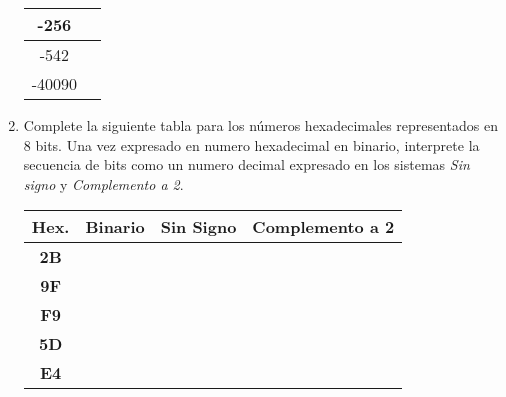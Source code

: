 \documentclass[12pt]{article}
\begin{document}
\begin{enumerate}
\begin{center}
\begin{tabular}[t]{|c|c|}
            \hline

                -256&\\

            \hline

                -542&\\

            \hline

                -40090&\\

            \hline

            \end{tabular}

        \end{center}

    \item Complete la siguiente tabla para los números hexadecimales
        representados en 8 bits. Una vez expresado en numero hexadecimal en
        binario, interprete la secuencia de bits como un numero decimal
        expresado en los sistemas \emph{Sin signo} y \emph{Complemento a 2}.

        \begin{center}

            \begin{tabular}[t]{|c|c|c|c|}

            \hline

                \textbf{Hex.} & \textbf{Binario} & \textbf{Sin Signo} & \textbf{Complemento a 2}\\

            \hline

                \textbf{2B} & \hspace{9em}~ &~&~\\

            \hline

            \textbf{9F}&&&\\

            \hline

            \textbf{F9}&&&\\

            \hline

            \textbf{5D}&&&\\

            \hline

            \textbf{E4}&&&\\

            \hline

            \end{tabular}


\end{center}
\end{enumerate}
\end{document}
